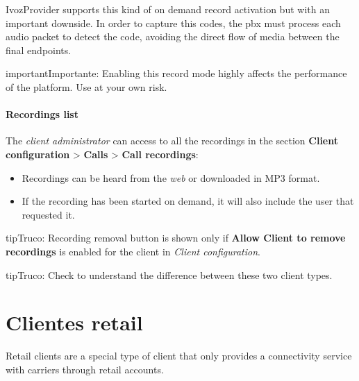 \documentclass[letterpaper,10pt,spanish]{sphinxmanual}
\begin{document}
IvozProvider supports this kind of on demand record activation but with an
important downside. In order to capture this codes, the pbx must process each
audio packet to detect the code, avoiding the direct flow of media between the
final endpoints.

\begin{notice}{important}{Importante:}
Enabling this record mode highly affects the performance of the
platform. Use at your own risk.
\end{notice}


\paragraph{Recordings list}
\label{administration_portal/client/residential/calls/call_recordings:recordings-list}
The \emph{client administrator} can access to all the recordings in the section
\textbf{Client configuration} \textgreater{} \textbf{Calls} \textgreater{} \textbf{Call recordings}:
\begin{itemize}
\item {} 
Recordings can be heard from the \emph{web} or downloaded in MP3 format.

\item {} 
If the recording has been started on demand, it will also include the user
that requested it.

\end{itemize}

\begin{notice}{tip}{Truco:}
Recording removal button is shown only if \textbf{Allow Client to remove recordings} is enabled
for the client in \emph{Client configuration}.
\end{notice}

\begin{notice}{tip}{Truco:}
Check {\hyperref[administration_portal/brand/clients/retail:differences\string-between\string-retail\string-and\string-residential\string-clients]{}} to understand the difference between these two
client types.
\end{notice}
\label{administration_portal/client/retail/index:retail-clients}

\section{Clientes retail}
\label{administration_portal/client/retail/index:retail-clients}\label{administration_portal/client/retail/index:clientes-retail}\label{administration_portal/client/retail/index::doc}\label{administration_portal/client/retail/index:id1}
Retail clients are a special type of client that only provides a connectivity
service with carriers through retail accounts.
\end{document}
